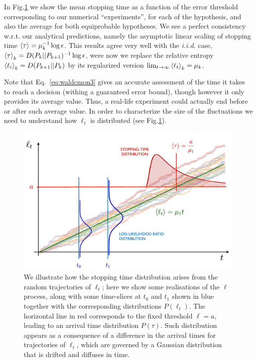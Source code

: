 In Fig.\ref{fig:cmonwald} we show the mean stopping time as a function of the error threshold
corresponding to our numerical ``experiments'', for each of the hypothesis, and also the average
for both equiprobable hypotheses. We see a perfect consistency  w.r.t. our analytical predictions, namely the asymptotic linear scaling of stopping time $\mathinner{\langle \tau\rangle}=\mu_{k}^{-1} \log\epsilon$. This results agree very well with the \textit{i.i.d.} case, $\mathinner{\langle \tau\rangle}_{k}=D(P_{k}||P_{k+1})^{-1} \log\epsilon$, were now we replace the relative entropy $\mathinner{\langle \ell_{i}\rangle}_{k}=D(P_{k+1}||P_{k})$ by its regularized version $\lim_{t\to\infty}\mathinner{\langle \ell_{t}\rangle}_{k}=\mu_{k}$.

Note that Eq.~\eqref{eq:waldcmon3} gives an accurate assessment of the time it takes to reach a decision (withing a guaranteed error bound), though however it only provides its average value. Thus, a real-life experiment could actually end before or after such average value. In order to characterize the size of the fluctuations we need to understand how $\ell_{t}$ is distributed (see Fig.\ref{fig:cmonwald}).

\begin{figure}[t!]
    \centering
    \includegraphics[width=1.\textwidth]{Figures/john_final_wald.pdf}
    \caption{We illustrate how the stopping time distribution arises from
    the random trajectories of $\ell_{t}$; here we show some realisations of the $\ell$ process, along with some time-slices at $t_0$ and $t_1$ shown in blue together with the  corresponding distributions $P(\ell_t)$. The horizontal line in red corresponds to the fixed threshold $\ell=a$, leading to an arrival time distribution $P(\tau)$. Such distribution appears as a consequence of a difference in the arrival times for trajectories of $\ell_{t}$, which are governed by a Gaussian distribution that is drifted and diffuses in time.}
    \label{fig:cmonwald}
\end{figure}

